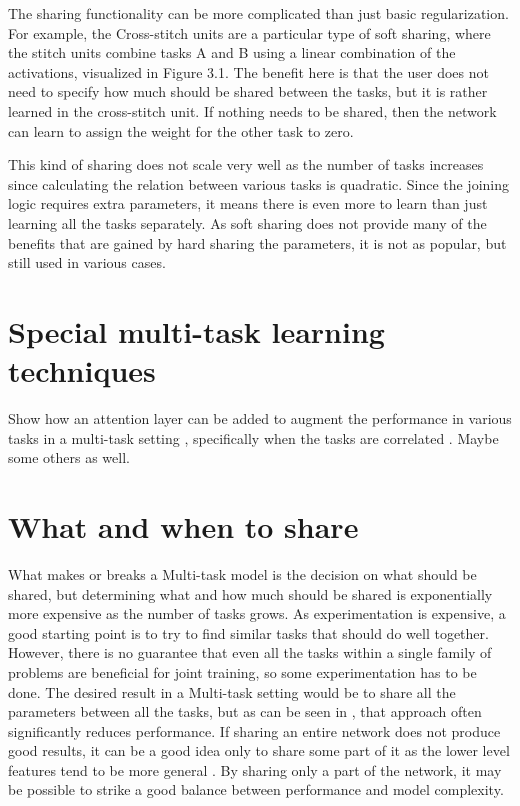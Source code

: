 The sharing functionality can be more complicated than just basic regularization. For example, the Cross-stitch units \citep{crossStitch} are a particular type of soft sharing, where the stitch units combine tasks A and B using a linear combination of the activations, visualized in Figure 3.1. The benefit here is that the user does not need to specify how much should be shared between the tasks, but it is rather learned in the cross-stitch unit. If nothing needs to be shared, then the network can learn to assign the weight for the other task to zero.

This kind of sharing does not scale very well as the number of tasks increases since calculating the relation between various tasks is quadratic. 
Since the joining logic requires extra parameters, it means there is even more to learn than just learning all the tasks separately. 
As soft sharing does not provide many of the benefits that are gained by hard sharing the parameters, it is not as popular, but still used in various cases.

\section{Special multi-task learning techniques}
Show how an attention layer can be added to augment the performance in various tasks in a multi-task setting \citep{multiTaskAttention}, specifically when the tasks are correlated \citep{multiTaskWeather} \citep{weatherNet}. Maybe some others as well.

\section{What and when to share}
What makes or breaks a Multi-task model is the decision on what should be shared, but determining what and how much should be shared is exponentially more expensive as the number of tasks grows. 
As experimentation is expensive, a good starting point is to try to find similar tasks that should do well together. 
However, there is no guarantee that even all the tasks within a single family of problems are beneficial for joint training, so some experimentation has to be done. 
The desired result in a Multi-task setting would be to share all the parameters between all the tasks, but as can be seen in \citep{uberNet}, that approach often significantly reduces performance.
If sharing an entire network does not produce good results, it can be a good idea only to share some part of it as the lower level features tend to be more general \citep{transferringMidLevelRepresentations}. 
By sharing only a part of the network, it may be possible to strike a good balance between performance and model complexity.


